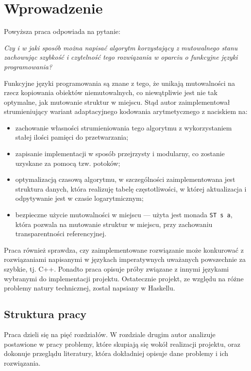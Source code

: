 \documentclass[../../praca.tex]{subfiles}
\begin{document}
\chapter{Wprowadzenie}

Powyższa praca odpowiada na pytanie:
\begin{center}
  \textit{Czy i w jaki sposób można napisać algorytm korzystający z mutowalnego stanu
  zachowując szybkość i czytelność tego rozwiązania w oparciu o funkcyjne
  języki programowania?}
\end{center}

Funkcyjne języki programowania są znane z tego, że unikają mutowalności 
na rzecz kopiowania obiektów niemutowalnych, co niewątpliwie jest nie tak optymalne,
jak mutowanie struktur w miejscu. Stąd autor zaimplementował strumieniujący
wariant adaptacyjnego kodowania arytmetycznego z naciskiem na:
\begin{itemize}
  \item zachowanie własności strumieniowania tego algorytmu z wykorzystaniem stałej
    ilości pamięci do przetwarzania;
  \item zapisanie implementacji w sposób przejrzysty i modularny, co zostanie uzyskane
    za pomocą tzw. potoków;
  \item optymalizacją czasową algorytmu, w szczególności zaimplementowana jest
    struktura danych, która realizuję tabelę częstotliwości, w której aktualizacja
    i odpytywanie jest w czasie logarytmicznym;
  \item bezpieczne użycie mutowalności w miejscu --- użyta jest monada \texttt{ST s a},
    która pozwala na mutowanie struktur w miejscu, przy zachowaniu transparentności
    referencyjnej.
\end{itemize}

Praca również sprawdza, czy zaimplementowane rozwiązanie może konkurować z rozwiązaniami
napisanymi w językach imperatywnych uważanych powszechnie za szybkie, tj. C++. 
Ponadto praca opisuje próby związane z innymi językami wybranymi do implementacji projektu.
Ostatecznie projekt, ze względu na różne problemy natury technicznej, został napsiany
w Haskellu.

\section{Struktura pracy}

Praca dzieli się na pięć rozdziałów. W rozdziale drugim autor analizuje postawione
w pracy problemy, które skupiają się wokół realizacji projektu, oraz dokonuje przeglądu
literatury, która dokładniej opisuje dane problemy i ich rozwiązania.
\end{document}
